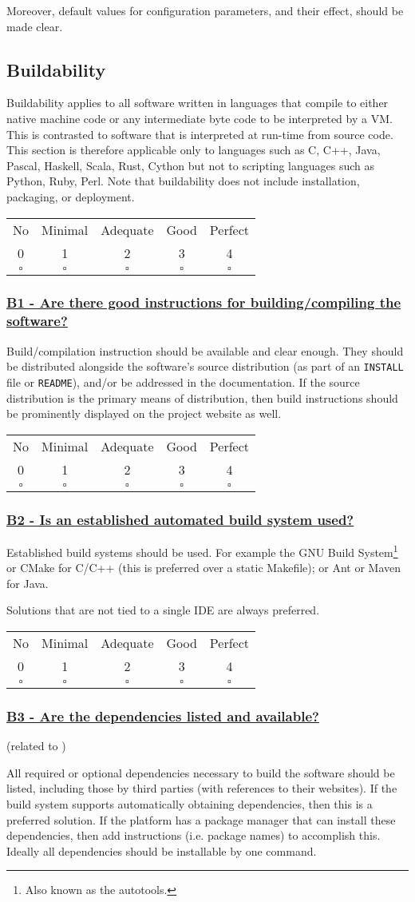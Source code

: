 \documentclass[a4paper,11pt]{article}
\newcommand{\criterion}[2]{\subsubsection*{\underline{#1 - #2}}\label{id:#1}}
\newcommand\CheckTable{%
  \begin{tabular}{ccccc}
    No & Minimal & Adequate & Good & Perfect \\
    0 & 1 & 2 & 3 & 4 \\
    \hline
    $\square$ & $\square$ & $\square$ & $\square$ & $\square$ \\
  \end{tabular}%
}
\newcommand{\refcrit}[1]{%
 \framebox[1.1\width]{\hyperref[id:#1]{#1}}
}
\begin{document}
Moreover, default values for configuration parameters, and their effect, should be
made clear.

\subsection{Buildability}\label{sec:bui}

Buildability applies to all software written in languages that compile to
either native machine code or any intermediate byte code to be interpreted by a VM.
This is contrasted to software that is interpreted at run-time from source
code. This section is therefore applicable only to languages such as C, C++,
Java, Pascal, Haskell, Scala, Rust, Cython but not to scripting languages such
as Python, Ruby, Perl.  Note that buildability does not include
installation, packaging, or deployment.

\CheckTable

\newcommand{\bOneID}{B1}
\newcommand{\bOneText}{Are there good instructions for building/compiling the software?}
\criterion{\bOneID}{\bOneText}

Build/compilation instruction should be available and clear enough. They should
be distributed alongside the software's source distribution (as part of an
\texttt{INSTALL} file or \texttt{README}), and/or be addressed in the documentation. If the
source distribution is the primary means of distribution, then build
instructions should be prominently displayed on the project website as well.

\CheckTable

\newcommand{\bTwoID}{B2}
\newcommand{\bTwoText}{Is an established automated build system used?}
\criterion{\bTwoID}{\bTwoText}

Established build systems should be used. For example the GNU Build
System\footnote{Also known as the autotools.} or CMake for C/C++ (this is
preferred over a static Makefile); or Ant or Maven for Java. 

Solutions that are not tied to a single IDE are always preferred.

\CheckTable

\newcommand{\bThreeID}{B3}
\newcommand{\bThreeText}{Are the dependencies listed and available?}
\criterion{\bThreeID}{\bThreeText}
(related to \refcrit{IS2})

All required or optional dependencies necessary to build the software should be
listed, including those by third parties (with references to their websites).
If the build system supports automatically obtaining dependencies, then this is
a preferred solution. If the platform has a package manager that can install
these dependencies, then add instructions (i.e. package names) to accomplish
this. Ideally all dependencies should be installable by one command.
\end{document}
